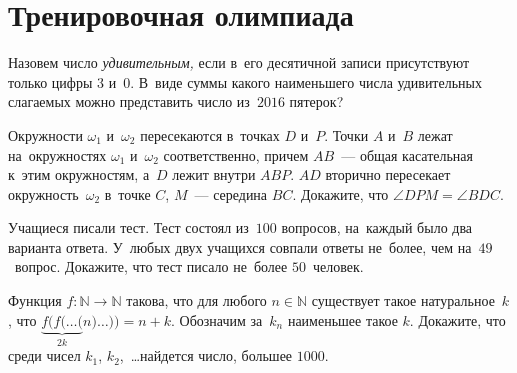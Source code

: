 
\section*{Тренировочная олимпиада}


\begin{problems}

\item
Назовем число \emph{удивительным,} если в~его десятичной записи присутствуют
только цифры $3$ и~$0$.
В~виде суммы какого наименьшего числа удивительных слагаемых можно представить
число из~$2016$ пятерок?

\item
Окружности $\omega_1$ и~$\omega_2$ пересекаются в~точках $D$ и~$P$.
Точки $A$ и~$B$ лежат на~окружностях $\omega_1$ и~$\omega_2$ соответственно,
причем $AB$~— общая касательная к~этим окружностям, а~$D$ лежит внутри $ABP$.
$AD$ вторично пересекает окружность~$\omega_2$ в~точке $C$,
$M$~--- середина $BC$.
Докажите, что $\angle DPM = \angle BDC$.

\item
Учащиеся писали тест.
Тест состоял из~$100$ вопросов, на~каждый было два варианта ответа.
У~любых двух учащихся совпали ответы не~более, чем на~$49$~вопрос.
Докажите, что тест писало не~более $50$~человек.

\item
Функция $f \colon \mathbb{N} \to \mathbb{N}$ такова, что для любого
$n \in \mathbb{N}$ существует такое натуральное~$k$, что
\(
    \underbrace{f(f(\ldots(}_{2k}
        n
    )\ldots))
=
    n + k
\).
Обозначим за~$k_n$ наименьшее такое $k$.
Докажите, что среди чисел $k_1$, $k_2$,~\ldots найдется число, большее $1000$.

\end{problems}

